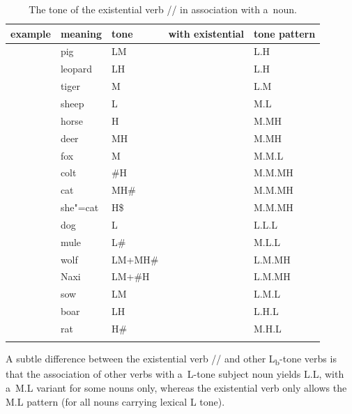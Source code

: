 \begin{table}%
\caption{\label{tab:thetoneoftheexistentialverbinassociationwithanoun}The tone of the existential verb // in association with a~noun.}
\begin{tabularx}{\textwidth}{ l@{\hspace{7mm}} l@{\hspace{7mm}} l@{\hspace{7mm}} Q l }
\lsptoprule
	example & meaning & tone & with existential & tone pattern\\ \midrule
	 & pig & LM &  & L.H\\
	 & leopard & LH &  & L.H\\
	 & tiger & M &  & L.M\\
	 & sheep & L &  & M.L\\
	 & horse & H &  & M.MH\\
	 & deer & MH &  & M.MH\\
	\addlinespace \hdashline \addlinespace
 	 & fox & M &  & M.M.L\\
	 & colt & \#H &  & M.M.MH\\
	 & cat & MH\# &  & M.M.MH\\
	 & she"=cat & H\$ &  & M.M.MH\\
	 & dog & L &  & L.L.L\\
	 & mule & L\# &  & M.L.L\\
	 & wolf & LM+MH\# &  & L.M.MH\\
	 & Naxi & LM+\#H &  & L.M.MH\\
	 & sow & LM &  & L.M.L\\
	 & boar & LH &  & L.H.L\\
	 & rat & H\# &  & M.H.L\\
\lspbottomrule
\end{tabularx}
\end{table}

A subtle difference between the existential verb // and other L\textsubscript{b}-tone verbs is that the
association of other verbs with a~L-tone subject noun yields L.L, with a~M.L variant for some nouns
only, whereas the existential verb only allows the M.L pattern (for all nouns carrying lexical L
tone).




